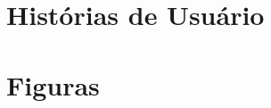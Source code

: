 \begin{apendicesenv}
    \partapendices

    \chapter{Histórias de Usuário}
    \label{ch:historias_de_usuario}
    

    \chapter{Figuras}
    \label{ch:figuras}
    
    
\end{apendicesenv}